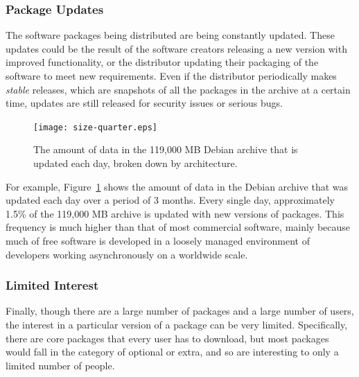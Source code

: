 \documentclass[conference]{IEEEtran}
\begin{document}
\subsubsection{Package Updates}

The software packages being distributed are being constantly
updated. These updates could be the result of the software creators
releasing a new version with improved functionality,
or the distributor updating their packaging of the
software to meet new requirements. Even if the distributor
periodically makes \emph{stable} releases, which are snapshots of
all the packages in the archive at a certain time, updates are still
released for security issues or serious bugs.

\begin{figure}
\centering
\texttt{[image: size-quarter.eps]}
\caption{The amount of data in the 119,000 MB Debian archive that is
updated each day, broken down by architecture.}
\label{update_size}
\end{figure}

For example, Figure~\ref{update_size} shows the amount of data in
the Debian archive that was updated each day over a period of 3
months. Every single day, approximately 1.5\% of the 119,000 MB archive is
updated with new versions of packages. This frequency is much higher than
that of most commercial software, mainly because much of free software is
developed in a loosely managed environment of developers working
asynchronously on a worldwide scale.

\subsubsection{Limited Interest}

Finally, though there are a large number of packages and a large number of
users, the interest in a particular version of a package can be very
limited. Specifically, there are core packages that every user has to download, but most
packages would fall in the category of optional or extra, and so are
interesting to only a limited number of people.
\end{document}
